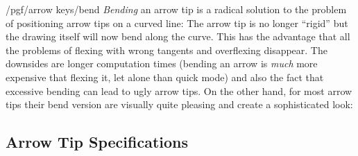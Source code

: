 \begin{key}{/pgf/arrow keys/bend}
    \emph{Bending} an arrow tip is a radical solution to the problem of
    positioning arrow tips on a curved line: The arrow tip is no longer
    ``rigid'' but the drawing itself will now bend along the curve. This has
    the advantage that all the problems of flexing with wrong tangents and
    overflexing disappear. The downsides are longer computation times (bending
    an arrow is \emph{much} more expensive that flexing it, let alone than
    quick mode) and also the fact that excessive bending can lead to ugly arrow
    tips. On the other hand, for most arrow tips their bend version are
    visually quite pleasing and create a sophisticated look:
\begin{codeexample}[preamble={\usetikzlibrary{arrows.meta,bending}}]
\end{codeexample}
\begin{codeexample}[preamble={\usetikzlibrary{bending}}]
\end{codeexample}
\begin{codeexample}[preamble={\usetikzlibrary{arrows.meta,bending}}]
\end{codeexample}
\end{key}


\subsection{Arrow Tip Specifications}
\label{section-arrow-spec}

